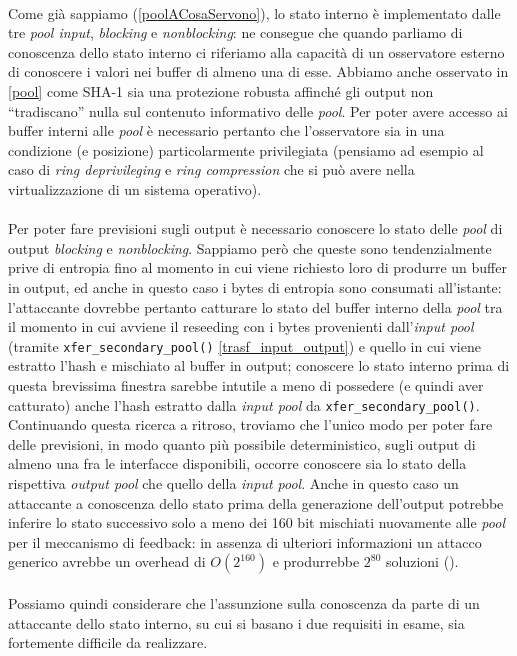 \documentclass{article}
\begin{document}
 \paragraph{} Come già sappiamo (\ref{poolACosaServono}), lo stato interno è
 implementato dalle tre \emph{pool input}, \emph{blocking} e \emph{nonblocking}:
 ne consegue che quando parliamo di conoscenza dello stato interno ci riferiamo
 alla capacità di un osservatore esterno di conoscere i valori nei buffer di
 almeno una di esse. Abbiamo anche osservato in \ref{pool} come SHA-1 sia una
 protezione robusta affinché gli output non ``tradiscano'' nulla sul
 contenuto informativo delle \emph{pool}. Per poter avere accesso ai buffer
 interni alle \emph{pool} è necessario pertanto che l'osservatore sia in una
 condizione (e posizione) particolarmente privilegiata (pensiamo ad esempio al
 caso di \emph{ring deprivileging} e \emph{ring compression} che si può avere
 nella virtualizzazione di un sistema operativo). 
 
 \paragraph{} Per poter fare previsioni sugli output è necessario conoscere lo
 stato delle \emph{pool} di output \emph{blocking} e \emph{nonblocking}.
 Sappiamo però che queste sono tendenzialmente prive di entropia fino al
 momento in cui viene richiesto loro di produrre un buffer in output, ed anche
 in questo caso i bytes di entropia sono consumati all'istante:
 l'attaccante dovrebbe pertanto catturare lo stato del buffer interno della
 \emph{pool} tra il momento in cui avviene il reseeding con i bytes provenienti
 dall'\emph{input pool} (tramite \verb+xfer_secondary_pool()+
 \ref{trasf_input_output}) e quello in cui viene estratto l'hash e mischiato al
 buffer in output; conoscere lo stato interno prima di questa brevissima
 finestra sarebbe intutile a meno di possedere (e quindi aver catturato) anche
 l'hash estratto dalla \emph{input pool} da \verb+xfer_secondary_pool()+.
 Continuando questa ricerca a ritroso, troviamo che l'unico modo per poter fare
 delle previsioni, in modo quanto più possibile deterministico, sugli output di
 almeno una fra le interfacce disponibili, occorre conoscere sia lo stato della
 rispettiva \emph{output pool} che quello della \emph{input pool}. Anche in
 questo caso un attaccante a conoscenza dello stato prima della generazione
 dell'output potrebbe inferire lo stato successivo solo a meno dei 160 bit
 mischiati nuovamente alle \emph{pool} per il meccanismo di feedback: in
 assenza di ulteriori informazioni un attacco generico avrebbe un overhead di
 $O(2^{160})$ e produrrebbe $2^{80}$ soluzioni (\cite{lach}). \\\\
 Possiamo quindi considerare che l'assunzione sulla conoscenza da parte di un
 attaccante dello stato interno, su cui si basano i due requisiti in esame, sia
 fortemente difficile da realizzare.
 
\end{document}
